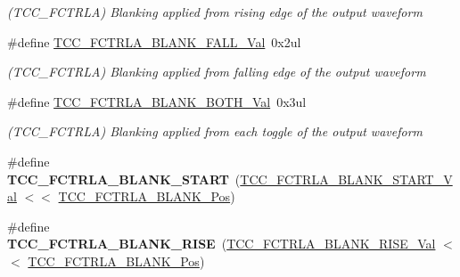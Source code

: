 \begin{DoxyCompactItemize}
\begin{DoxyCompactList}\small\item\em (T\+C\+C\+\_\+\+F\+C\+T\+R\+L\+A) Blanking applied from rising edge of the output waveform \end{DoxyCompactList}\item 
\hypertarget{group___s_a_m_l21___t_c_c_gad6f465e0d748dc05194f1945be43b360}{}\#define \hyperlink{group___s_a_m_l21___t_c_c_gad6f465e0d748dc05194f1945be43b360}{T\+C\+C\+\_\+\+F\+C\+T\+R\+L\+A\+\_\+\+B\+L\+A\+N\+K\+\_\+\+F\+A\+L\+L\+\_\+\+Val}~0x2ul\label{group___s_a_m_l21___t_c_c_gad6f465e0d748dc05194f1945be43b360}

\begin{DoxyCompactList}\small\item\em (T\+C\+C\+\_\+\+F\+C\+T\+R\+L\+A) Blanking applied from falling edge of the output waveform \end{DoxyCompactList}\item 
\hypertarget{group___s_a_m_l21___t_c_c_gad9d4204aefc55605386280e8930f7e2b}{}\#define \hyperlink{group___s_a_m_l21___t_c_c_gad9d4204aefc55605386280e8930f7e2b}{T\+C\+C\+\_\+\+F\+C\+T\+R\+L\+A\+\_\+\+B\+L\+A\+N\+K\+\_\+\+B\+O\+T\+H\+\_\+\+Val}~0x3ul\label{group___s_a_m_l21___t_c_c_gad9d4204aefc55605386280e8930f7e2b}

\begin{DoxyCompactList}\small\item\em (T\+C\+C\+\_\+\+F\+C\+T\+R\+L\+A) Blanking applied from each toggle of the output waveform \end{DoxyCompactList}\item 
\hypertarget{group___s_a_m_l21___t_c_c_ga0bd60231598baa31248590ff9cbc2566}{}\#define {\bfseries T\+C\+C\+\_\+\+F\+C\+T\+R\+L\+A\+\_\+\+B\+L\+A\+N\+K\+\_\+\+S\+T\+A\+R\+T}~(\hyperlink{group___s_a_m_l21___t_c_c_gac735e9a21fdc48838d75976a5f7a64d5}{T\+C\+C\+\_\+\+F\+C\+T\+R\+L\+A\+\_\+\+B\+L\+A\+N\+K\+\_\+\+S\+T\+A\+R\+T\+\_\+\+Val}    $<$$<$ \hyperlink{group___s_a_m_l21___t_c_c_ga415d0c8ac0d97192b0e236e3a6184824}{T\+C\+C\+\_\+\+F\+C\+T\+R\+L\+A\+\_\+\+B\+L\+A\+N\+K\+\_\+\+Pos})\label{group___s_a_m_l21___t_c_c_ga0bd60231598baa31248590ff9cbc2566}

\item 
\hypertarget{group___s_a_m_l21___t_c_c_gae6dd0b09f157278f857db080d7ed1ae2}{}\#define {\bfseries T\+C\+C\+\_\+\+F\+C\+T\+R\+L\+A\+\_\+\+B\+L\+A\+N\+K\+\_\+\+R\+I\+S\+E}~(\hyperlink{group___s_a_m_l21___t_c_c_ga455a4d557f1350bd36aa311fdc23b4c2}{T\+C\+C\+\_\+\+F\+C\+T\+R\+L\+A\+\_\+\+B\+L\+A\+N\+K\+\_\+\+R\+I\+S\+E\+\_\+\+Val}     $<$$<$ \hyperlink{group___s_a_m_l21___t_c_c_ga415d0c8ac0d97192b0e236e3a6184824}{T\+C\+C\+\_\+\+F\+C\+T\+R\+L\+A\+\_\+\+B\+L\+A\+N\+K\+\_\+\+Pos})\label{group___s_a_m_l21___t_c_c_gae6dd0b09f157278f857db080d7ed1ae2}


\end{DoxyCompactItemize}

